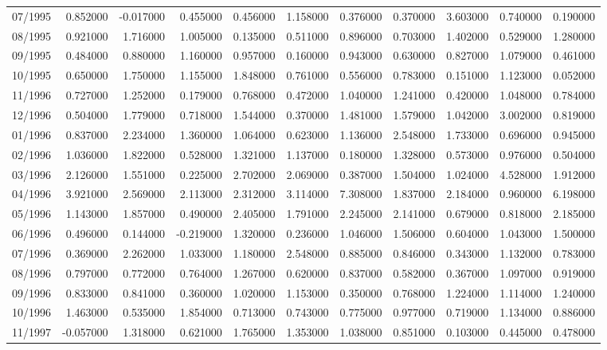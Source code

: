 \begin{tabular}{lrrrrrrrrrr}
07/1995 & 0.852000 & -0.017000 & 0.455000 & 0.456000 & 1.158000 & 0.376000 & 0.370000 & 3.603000 & 0.740000 & 0.190000 \\
08/1995 & 0.921000 & 1.716000 & 1.005000 & 0.135000 & 0.511000 & 0.896000 & 0.703000 & 1.402000 & 0.529000 & 1.280000 \\
09/1995 & 0.484000 & 0.880000 & 1.160000 & 0.957000 & 0.160000 & 0.943000 & 0.630000 & 0.827000 & 1.079000 & 0.461000 \\
10/1995 & 0.650000 & 1.750000 & 1.155000 & 1.848000 & 0.761000 & 0.556000 & 0.783000 & 0.151000 & 1.123000 & 0.052000 \\
11/1996 & 0.727000 & 1.252000 & 0.179000 & 0.768000 & 0.472000 & 1.040000 & 1.241000 & 0.420000 & 1.048000 & 0.784000 \\
12/1996 & 0.504000 & 1.779000 & 0.718000 & 1.544000 & 0.370000 & 1.481000 & 1.579000 & 1.042000 & 3.002000 & 0.819000 \\
01/1996 & 0.837000 & 2.234000 & 1.360000 & 1.064000 & 0.623000 & 1.136000 & 2.548000 & 1.733000 & 0.696000 & 0.945000 \\
02/1996 & 1.036000 & 1.822000 & 0.528000 & 1.321000 & 1.137000 & 0.180000 & 1.328000 & 0.573000 & 0.976000 & 0.504000 \\
03/1996 & 2.126000 & 1.551000 & 0.225000 & 2.702000 & 2.069000 & 0.387000 & 1.504000 & 1.024000 & 4.528000 & 1.912000 \\
04/1996 & 3.921000 & 2.569000 & 2.113000 & 2.312000 & 3.114000 & 7.308000 & 1.837000 & 2.184000 & 0.960000 & 6.198000 \\
05/1996 & 1.143000 & 1.857000 & 0.490000 & 2.405000 & 1.791000 & 2.245000 & 2.141000 & 0.679000 & 0.818000 & 2.185000 \\
06/1996 & 0.496000 & 0.144000 & -0.219000 & 1.320000 & 0.236000 & 1.046000 & 1.506000 & 0.604000 & 1.043000 & 1.500000 \\
07/1996 & 0.369000 & 2.262000 & 1.033000 & 1.180000 & 2.548000 & 0.885000 & 0.846000 & 0.343000 & 1.132000 & 0.783000 \\
08/1996 & 0.797000 & 0.772000 & 0.764000 & 1.267000 & 0.620000 & 0.837000 & 0.582000 & 0.367000 & 1.097000 & 0.919000 \\
09/1996 & 0.833000 & 0.841000 & 0.360000 & 1.020000 & 1.153000 & 0.350000 & 0.768000 & 1.224000 & 1.114000 & 1.240000 \\
10/1996 & 1.463000 & 0.535000 & 1.854000 & 0.713000 & 0.743000 & 0.775000 & 0.977000 & 0.719000 & 1.134000 & 0.886000 \\
11/1997 & -0.057000 & 1.318000 & 0.621000 & 1.765000 & 1.353000 & 1.038000 & 0.851000 & 0.103000 & 0.445000 & 0.478000 \\

\end{tabular}
